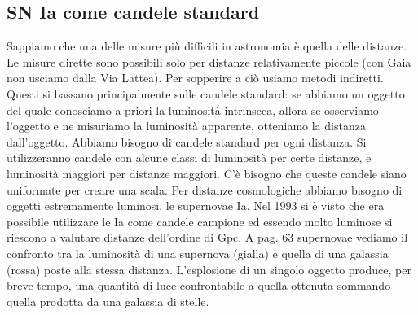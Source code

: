 \subsection*{SN Ia come candele standard}
Sappiamo che una delle misure più difficili in astronomia è quella delle distanze. Le misure dirette sono possibili solo per distanze relativamente piccole (con Gaia non usciamo dalla Via Lattea). Per sopperire a ciò usiamo metodi indiretti. Questi si bassano principalmente sulle candele standard: se abbiamo un oggetto del quale conosciamo a priori la luminosità intrinseca, allora se osserviamo l'oggetto e ne misuriamo la luminosità apparente, otteniamo la distanza dall'oggetto. Abbiamo bisogno di candele standard per ogni distanza. Si utilizzeranno candele con alcune classi di luminosità per certe distanze, e luminosità maggiori per distanze maggiori. C'è bisogno che queste candele siano uniformate per creare una scala. Per distanze cosmologiche abbiamo bisogno di oggetti estremamente luminosi, le supernovae Ia. Nel 1993 si è visto che era possibile utilizzare le Ia come candele campione ed essendo molto luminose si riescono a valutare distanze dell'ordine di Gpc. A pag. 63 supernovae vediamo il confronto tra la luminosità di una supernova (gialla) e quella di una galassia (rossa) poste alla stessa distanza. L'esplosione di un singolo oggetto produce, per breve tempo, una quantità di luce confrontabile a quella ottenuta sommando quella prodotta da una galassia di stelle.